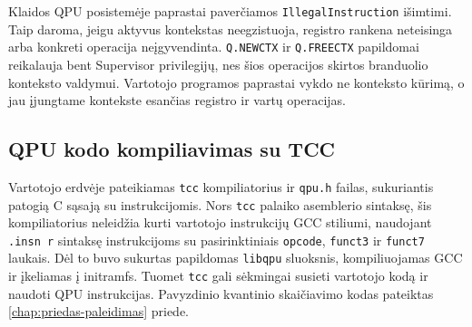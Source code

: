 Klaidos QPU posistemėje paprastai paverčiamos \texttt{IllegalInstruction} išimtimi. Taip daroma, jeigu aktyvus kontekstas neegzistuoja, registro rankena neteisinga arba konkreti operacija neįgyvendinta. \texttt{Q.NEWCTX} ir \texttt{Q.FREECTX} papildomai reikalauja bent Supervisor privilegijų, nes šios operacijos skirtos branduolio konteksto valdymui. Vartotojo programos paprastai vykdo ne konteksto kūrimą, o jau įjungtame kontekste esančias registro ir vartų operacijas.

\subsection{QPU kodo kompiliavimas su TCC}

Vartotojo erdvėje pateikiamas \texttt{tcc} kompiliatorius ir \texttt{qpu.h} failas, sukuriantis patogią C sąsają su instrukcijomis. Nors \texttt{tcc} palaiko asemblerio sintaksę, šis kompiliatorius neleidžia kurti vartotojo instrukcijų GCC stiliumi, naudojant \texttt{.insn r} sintaksę instrukcijoms su pasirinktiniais \texttt{opcode}, \texttt{funct3} ir \texttt{funct7} laukais. Dėl to buvo sukurtas papildomas \texttt{libqpu} sluoksnis, kompiliuojamas GCC ir įkeliamas į initramfs. Tuomet \texttt{tcc} gali sėkmingai susieti vartotojo kodą ir naudoti QPU instrukcijas. Pavyzdinio kvantinio skaičiavimo kodas pateiktas \ref{chap:priedas-paleidimas} priede.
